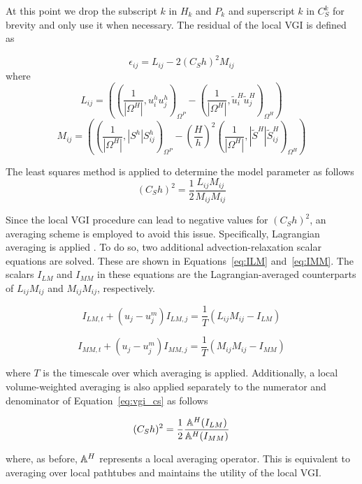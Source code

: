 At this point we drop the subscript $k$ in $H_k$ and $P_k$ and superscript
$k$ in $C_S^k$ for brevity and only use it when necessary.
The residual of the local VGI is defined as

\begin{equation}
\label{eq:vgilres}
\epsilon_{ij} = L_{ij} - 2 (C_S h)^2 M_{ij}
\end{equation}
\noindent where
\begin{equation}
\label{eq:lij}
L_{ij} = \left(\left(\frac{1}{|\Omega^H|}, u^h_i u^h_j\right)_{\Omega^P} - \left(\frac{1}{|\Omega^H|}, \widetilde{u}^H_i \widetilde{u}^H_j\right)_{\Omega^H} \right)
\end{equation}
\begin{equation}
\label{eq:mij}
M_{ij} = \left(\left(\frac{1}{|\Omega^H|}, |S^h| S^h_{ij}\right)_{\Omega^P} - \left(\frac{H}{h}\right)^2\left(\frac{1}{|\Omega^H|}, |\widetilde{S}^H| \widetilde{S}^H_{ij}\right)_{\Omega^H} \right)
\end{equation}

The least squares method is applied to determine the model parameter as follows
\begin{equation}
\label{eq:vgi_cs}
(C_S h)^2 = \frac{1}{2}\frac{L_{ij}M_{ij}}{M_{ij}M_{ij}}
\end{equation}

Since the local VGI procedure can lead to negative values
for $(C_S h)^2$, an averaging scheme is employed to avoid this issue.
Specifically, Lagrangian averaging 
is applied \cite{bib:meneveau96}.
To do so, two additional advection-relaxation scalar equations are solved.
These are shown in Equations~\eqref{eq:ILM} and~\eqref{eq:IMM}.
The scalars $I_{LM}$ and $I_{MM}$ in these equations are the
Lagrangian-averaged counterparts of
$L_{ij} M_{ij}$ and $M_{ij} M_{ij}$, respectively.

\begin{equation}
\label{eq:ILM}
  I_{LM,t} + (u_j - u^m_j) I_{LM,j} = \frac{1}{T} (L_{ij}M_{ij} - I_{LM})
\end{equation}

\begin{equation}
\label{eq:IMM}
  I_{MM,t}+ (u_j - u^m_j) I_{MM,j} = \frac{1}{T} (M_{ij}M_{ij} - I_{MM})
\end{equation}

\noindent where $T$ is the timescale over which averaging is applied.
Additionally, a local volume-weighted averaging
is also applied separately to the numerator and denominator
of Equation~\eqref{eq:vgi_cs} as follows

\begin{equation}
\label{eq:CS_LDS}
  (C_S h)^2 = \frac{1}{2}\frac{\mathbb{A}^{H}(I_{LM})}{\mathbb{A}^{H}(I_{MM})}
\end{equation}

\noindent where, as before, $\mathbb{A}^{H}$ represents a local averaging operator.
This is equivalent to averaging over local pathtubes \cite{bib:tran2016,bib:tran2017b} and maintains the utility of the local VGI.

